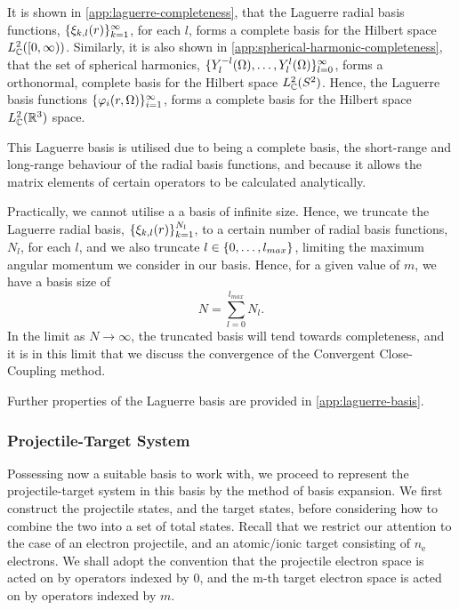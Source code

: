 \documentclass[draft]{article}
\begin{document}
It is shown in \autoref{app:laguerre-completeness}, that the Laguerre radial
basis functions, $\lbrace\xi_{k, l}(r)\rbrace_{k = 1}^{\infty}$, for each $l$,
forms a complete basis for the Hilbert space $L_{\mathbb{C}}^{2}([0, \infty))$.
Similarly, it is also shown in \autoref{app:spherical-harmonic-completeness},
that the set of spherical harmonics,
$\lbrace Y_{l}^{-l}(\Omega), \dotsc, Y_{l}^{l}(\Omega)\rbrace_{l = 0}^{\infty}$,
forms a orthonormal, complete basis for the Hilbert space
$L_{\mathbb{C}}^{2}(S^{2})$.
Hence, the Laguerre basis functions
$\lbrace\varphi_{i}(r, \Omega)\rbrace_{i = 1}^{\infty}$, forms a complete basis
for the Hilbert space $L_{\mathbb{C}}^{2}(\mathbb{R}^{3})$ space.

This Laguerre basis is utilised due to being a complete basis, the short-range
and long-range behaviour of the radial basis functions, and because it allows
the matrix elements of certain operators to be calculated analytically.

Practically, we cannot utilise a a basis of infinite size.
Hence, we truncate the Laguerre radial basis,
$\lbrace\xi_{k, l}(r)\rbrace_{k = 1}^{N_{l}}$, to a certain number of radial basis
functions, $N_{l}$, for each $l$, and we also truncate
$l \in \lbrace0, \dotsc, l_{max}\rbrace$,
limiting the maximum angular momentum we consider in our basis.
Hence, for a given value of $m$, we have a basis size of
\begin{equation}
  \label{eq:basis-size}
  N
  =
  \sum_{l = 0}^{l_{max}}
  N_{l}
  .
\end{equation}
In the limit as $N \to \infty$, the truncated basis will tend towards
completeness, and it is in this limit that we discuss the convergence of the
Convergent Close-Coupling method.

Further properties of the Laguerre basis are provided in
\autoref{app:laguerre-basis}.

\subsubsection{Projectile-Target System}
\label{sec:projectile-target}

Possessing now a suitable basis to work with, we proceed to represent the
projectile-target system in this basis by the method of basis expansion.
We first construct the projectile states, and the target states, before
considering how to combine the two into a set of total states.
Recall that we restrict our attention to the case of an electron projectile, and
an atomic/ionic target consisting of $n_{\mathrm{e}}$ electrons.
We shall adopt the convention that the projectile electron space is acted on by
operators indexed by $0$, and the m-th target electron space is acted on by
operators indexed by $m$.
\end{document}
